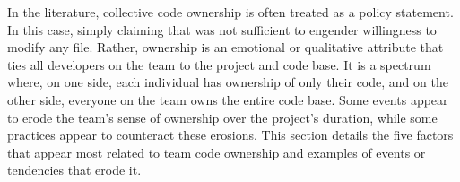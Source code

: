 In the literature, collective code ownership is often treated as a policy statement. In this case, simply claiming that  was not sufficient to engender willingness to modify any file. Rather, ownership is an emotional or qualitative attribute that ties all developers on the team to the project and code base. It is a spectrum where, on one side, each individual has ownership of only their code, and on the other side, everyone on the team owns the entire code base. Some events appear to erode the team's sense of ownership over the project's duration, while some practices appear to counteract these erosions. This section details the five factors that appear most related to team code ownership and examples of events or tendencies that erode it. 

